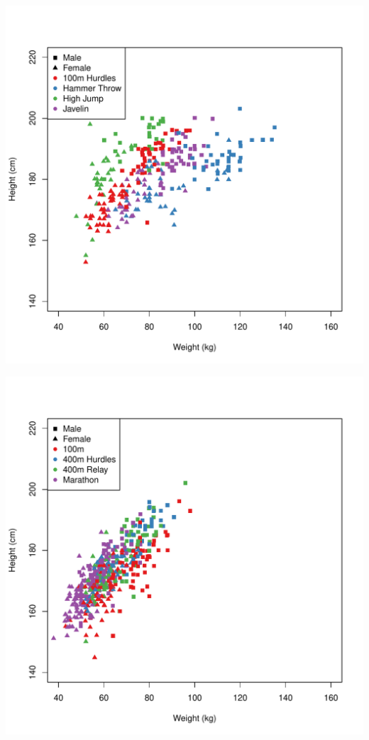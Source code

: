 \documentclass[landscape, paperwidth=42in, paperheight=36in,
fontscale=.35, margin=1in]{baposter}
\begin{document}
\begin{poster}
{\begin{center}
  \begin{minipage}{0.45\textwidth}
    \begin{center}
      \includegraphics[scale=0.20]{../graphics/javelin.pdf}
    \end{center}
  \end{minipage}
  \hspace{0.05\textwidth}
  \begin{minipage}{0.45\textwidth}
    \begin{center}
      \includegraphics[scale=0.20]{../graphics/marathon.pdf}
    \end{center}
  \end{minipage}
  \end{center}
 }


\end{poster}
\end{document}
